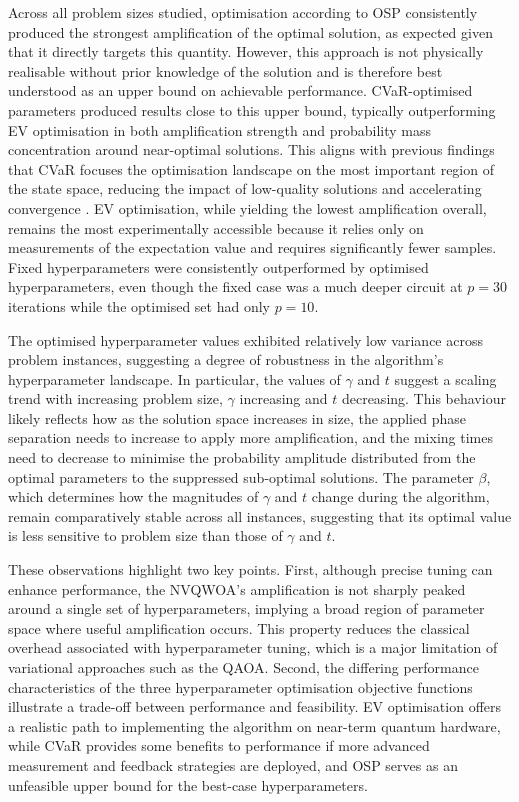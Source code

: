 Across all problem sizes studied, optimisation according to OSP consistently produced the strongest amplification of the optimal solution, as expected given that it directly targets this quantity. However, this approach is not physically realisable without prior knowledge of the solution and is therefore best understood as an upper bound on achievable performance. CVaR-optimised parameters produced results close to this upper bound, typically outperforming EV optimisation in both amplification strength and probability mass concentration around near-optimal solutions. This aligns with previous findings that CVaR focuses the optimisation landscape on the most important region of the state space, reducing the impact of low-quality solutions and accelerating convergence \cite{cvar_opt,CVaR_quantum}. EV optimisation, while yielding the lowest amplification overall, remains the most experimentally accessible because it relies only on measurements of the expectation value and requires significantly fewer samples. Fixed hyperparameters were consistently outperformed by optimised hyperparameters, even though the fixed case was a much deeper circuit at $p=30$ iterations while the optimised set had only $p=10$.

The optimised hyperparameter values exhibited relatively low variance across problem instances, suggesting a degree of robustness in the algorithm's hyperparameter landscape. In particular, the values of $\gamma$ and $t$ suggest a scaling trend with increasing problem size, $\gamma$ increasing and $t$ decreasing. This behaviour likely reflects how as the solution space increases in size, the applied phase separation needs to increase to apply more amplification, and the mixing times need to decrease to minimise the probability amplitude distributed from the optimal parameters to the suppressed sub-optimal solutions. The parameter $\beta$, which determines how the magnitudes of $\gamma$ and $t$ change during the algorithm, remain comparatively stable across all instances, suggesting that its optimal value is less sensitive to problem size than those of $\gamma$ and $t$. 

These observations highlight two key points. First, although precise tuning can enhance performance, the NVQWOA's amplification is not sharply peaked around a single set of hyperparameters, implying a broad region of parameter space where useful amplification occurs. This property reduces the classical overhead associated with hyperparameter tuning, which is a major limitation of variational approaches such as the QAOA. Second, the differing performance characteristics of the three hyperparameter optimisation objective functions illustrate a trade-off between performance and feasibility. EV optimisation offers a realistic path to implementing the algorithm on near-term quantum hardware, while CVaR provides some benefits to performance if more advanced measurement and feedback strategies are deployed, and OSP serves as an unfeasible upper bound for the best-case hyperparameters.

